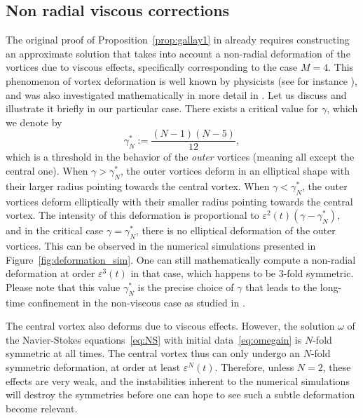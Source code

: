 \documentclass[11pt,reqno,a4paper]{amsart}
\def\eps{\varepsilon}
\newcommand{\1}{\mathbbm{1}}
\theoremstyle{definition}
\theoremstyle{definition}
\numberwithin{equation}{section}
\begin{document}
\subsection{Non radial viscous corrections}\label{sec:corrections}

The original proof of Proposition~\ref{prop:gallay1} in \cite{Gallay2011} already requires constructing an approximate solution that takes into account a non-radial deformation of the vortices due to viscous effects, specifically corresponding to the case $M=4$. This phenomenon of vortex deformation is well known by physicists (see for instance \cite{DiVer2002,Dritschel1985}), and was also investigated mathematically in more detail in \cite{donati2025fast}. Let us discuss and illustrate it briefly in our particular case. There exists a critical value for $\gamma$, which we denote by 
\begin{equation}
\label{eq:gammaN*}
    \gamma_N^* := \frac{(N-1)(N-5)}{12},
\end{equation}
which is a threshold in the behavior of the \emph{outer} vortices (meaning all except the central one). When $\gamma > \gamma_N^*$, the outer vortices deform in an elliptical shape with their larger radius pointing towards the central vortex. When $\gamma < \gamma_N^*$, the outer vortices deform elliptically with their smaller radius pointing towards the central vortex. The intensity of this deformation is proportional to $\eps^2(t)(\gamma-\gamma_N^*)$, and in the critical case $\gamma = \gamma_N^*$, there is no elliptical deformation of the outer vortices. This can be observed in the numerical simulations presented in Figure~\ref{fig:deformation_sim}. One can still mathematically compute a non-radial deformation at order $\eps^3(t)$ in that case, which happens to be 3-fold symmetric. Please note that this value $\gamma_N^*$ is the precise choice of $\gamma$ that leads to the long-time confinement in the non-viscous case as studied in \cite{Donati_2025_Crystal}.

The central vortex also deforms due to viscous effects. However, the solution $\omega$ of the Navier-Stokes equations~\cref{eq:NS} with initial data~\cref{eq:omegain} is $N$-fold symmetric at all times. The central vortex thus can only undergo an $N$-fold symmetric deformation, at order at least $\eps^N(t)$. Therefore, unless $N=2$, these effects are very weak, and the instabilities inherent to the numerical simulations will destroy the symmetries before one can hope to see such a subtle deformation become relevant.
\end{document}
